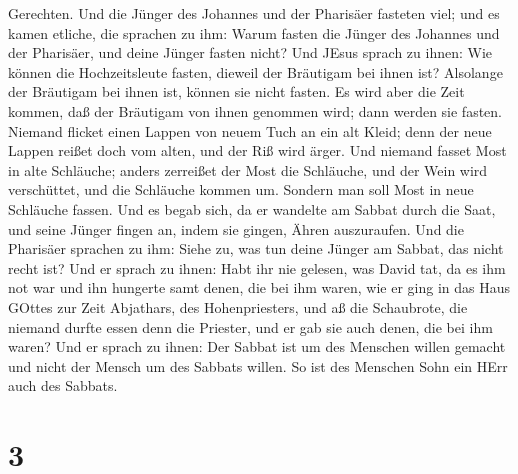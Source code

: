 Gerechten.  Und die Jünger des Johannes und der Pharisäer
fasteten viel; und es kamen etliche, die sprachen zu ihm: Warum fasten
die Jünger des Johannes und der Pharisäer, und deine Jünger fasten
nicht?  Und JEsus sprach zu ihnen: Wie können die
Hochzeitsleute fasten, dieweil der Bräutigam bei ihnen ist? Alsolange
der Bräutigam bei ihnen ist, können sie nicht fasten.  Es
wird aber die Zeit kommen, daß der Bräutigam von ihnen genommen wird;
dann werden sie fasten.  Niemand flicket einen Lappen von
neuem Tuch an ein alt Kleid; denn der neue Lappen reißet doch vom alten,
und der Riß wird ärger.  Und niemand fasset Most in alte
Schläuche; anders zerreißet der Most die Schläuche, und der Wein wird
verschüttet, und die Schläuche kommen um. Sondern man soll Most in neue
Schläuche fassen.  Und es begab sich, da er wandelte am
Sabbat durch die Saat, und seine Jünger fingen an, indem sie gingen,
Ähren auszuraufen.  Und die Pharisäer sprachen zu ihm:
Siehe zu, was tun deine Jünger am Sabbat, das nicht recht ist?
 Und er sprach zu ihnen: Habt ihr nie gelesen, was David
tat, da es ihm not war und ihn hungerte samt denen, die bei ihm waren,
 wie er ging in das Haus GOttes zur Zeit Abjathars, des
Hohenpriesters, und aß die Schaubrote, die niemand durfte essen denn die
Priester, und er gab sie auch denen, die bei ihm waren? 
Und er sprach zu ihnen: Der Sabbat ist um des Menschen willen gemacht
und nicht der Mensch um des Sabbats willen.  So ist des
Menschen Sohn ein HErr auch des Sabbats.

\hypertarget{section-2}{%
\section{3}\label{section-2}}

